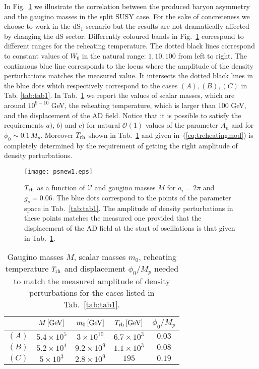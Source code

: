 \documentclass[11pt,a4paper]{article}
\newcommand\vo{{\mathcal{V}}}
\newcommand{\mc}{\mathcal}
\begin{document}
In Fig.~\ref{fig:plot1} we illustrate the correlation between the produced baryon asymmetry and the gaugino masses in the split SUSY case. For the sake of concreteness we choose to work in the dS$_1$ scenario but the results are not dramatically affected by changing the dS sector. Differently coloured bands in Fig.~\ref{fig:plot1} correspond to different ranges for the reheating temperature. The dotted black lines correspond to constant values of $W_0$ in the natural range: $1, 10, 100$ from left to right. The continuous blue line corresponds to the locus where the amplitude of the density perturbations matches the measured value. It intersects the dotted black lines in the blue dots which respectively correspond to the cases $(A), (B), (C)$ in Tab. \ref{tab:tab1}. In Tab.~\ref{tab:tab2} we report the values of scalar masses, which are around $10^{9-10}$ GeV, the reheating temperature, which is larger than $100$ GeV, and the displacement of the AD field. Notice that it is possible to satisfy the requirements $a)$, $b)$ and $c)$ for natural $\mc{O}(1)$ values of the parameter $A_n$ and for $\phi_0 \sim 0.1\,M_p$. Moreover $T_{\rm rh}$ shown in Tab.~\ref{tab:tab2} and given in~(\ref{eq:treheatingmod}) is completely determined by the requirement of getting the right amplitude of density perturbations.


\begin{figure}[h!]
\begin{center}
\texttt{[image: psnew1.eps]}
\caption{$T_{\rm rh}$ as a function of $\vo$ and gaugino masses $M$ for $a_i=2\pi$ and $g_s = 0.06$. The blue dots correspond to the points of the parameter space in Tab.~\ref{tab:tab1}. The amplitude of density perturbations in these points matches the measured one provided that the displacement of the AD field at the start of oscillations is that given in Tab.~\ref{tab:tab2}.} \label{fig:plot1}
\end{center}
\end{figure}


\begin{table}[h!]
\begin{center}
\begin{tabular}{ccccc}
\hline
 & $M \, [\rm{GeV}]$ & $m_0 \, [\rm{GeV}]$ & $T_{\rm rh} \, [\rm{GeV}]$ & $\phi_0/M_p$\\
\hline
$(A)$ & $5.4 \times 10^5$ & $3 \times 10^{10}$ & $6.7 \times 10^3$ & $0.03$ \\
\hline
$(B)$ & $5.2 \times 10^4$ & $9.2 \times 10^9$ & $1.1 \times 10^3$ & $0.08$ \\
\hline
$(C)$ & $5 \times 10^3$ & $2.8 \times 10^9$ & $195$ & $0.19$ \\
\hline
\end{tabular}
\end{center}
\caption{Gaugino masses $M$, scalar masses $m_0$, reheating temperature $T_{\rm rh}$ and displacement $\phi_0/M_p$ needed to match the measured amplitude of density perturbations for the cases listed in Tab.~\ref{tab:tab1}.}
\label{tab:tab2}
\end{table}
\end{document}
